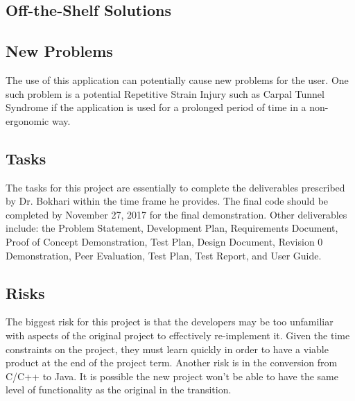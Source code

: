 \documentclass[12pt, titlepage]{article}
\begin{document}

\subsection{Off-the-Shelf Solutions}
\indent {}

\subsection{New Problems}
\indent \indent The use of this application can potentially cause new problems for the user. One such problem is a potential Repetitive Strain Injury such as Carpal Tunnel Syndrome if the application is used for a prolonged period of time in a non-ergonomic way. 

\subsection{Tasks}
\indent \indent The tasks for this project are essentially to complete the deliverables prescribed by Dr. Bokhari within the time frame he provides. The final code should be completed by November 27, 2017 for the final demonstration. Other deliverables include: the Problem Statement, Development Plan, Requirements Document, Proof of Concept Demonstration, Test Plan, Design Document, Revision 0 Demonstration, Peer Evaluation, Test Plan, Test Report, and User Guide.

\subsection{Risks}
\indent \indent The biggest risk for this project is that the developers may be too unfamiliar with aspects of the original project to effectively re-implement it. Given the time constraints on the project, they must learn quickly in order to have a viable product at the end of the project term. Another risk is in the conversion from C/C++ to Java. It is possible the new project won't be able to have the same level of functionality as the original in the transition.
\end{document}
